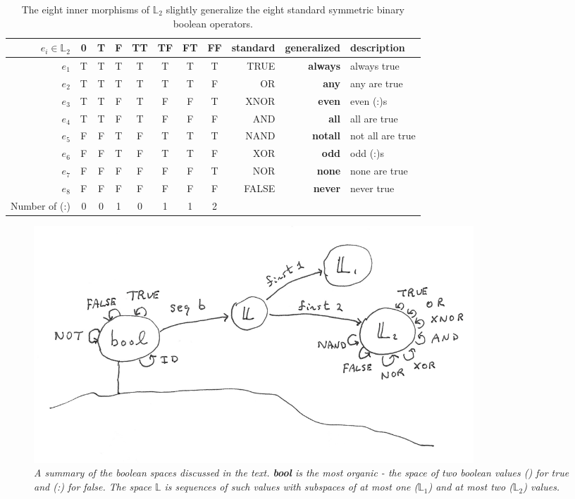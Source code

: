 \documentclass[11pt]{article}
\begin{document}
\begin{table}
\caption{The eight inner morphisms of ${\mathbb L}_2$ slightly generalize the eight standard symmetric binary boolean operators.}
\centering 
\begin{tabular}{r c c c c c c c r r l}
\hline\hline
$e_i \in {\mathbb L}_2$ & 0 & T & F & TT & TF & FT & FF & standard & generalized & description \\ [0.5ex] 
\hline
$e_1$  & T & T & T & T & T & T & T & TRUE & {\bf always} & always true \\
$e_2$  & T & T & T & T & T & T & F & OR & {\bf any} & any are true \\
$e_3$  & T & T & F & T & F & F & T & XNOR & {\bf even} & even (:)s \\
$e_4$ & T & T & F & T & F & F & F & AND & {\bf all} & all are true \\
$e_5$ & F & F & T & F & T & T & T & NAND & {\bf notall} & not all are true \\
$e_6$ & F & F & T & F & T & T & F & XOR & {\bf odd} & odd (:)s \\
$e_7$ & F & F & F & F & F & F & T & NOR & {\bf none} & none are true  \\
$e_8$ & F & F & F & F & F & F & F & FALSE & {\bf never} & never true \\
\hline
Number of (:)   & 0 & 0 & 1 & 0 & 1 & 1 & 2 &  \\ 
\hline
\end{tabular}
\label{table:L2}
\end{table} 

\begin{figure}[h]
\centering
\includegraphics[width=0.8\textwidth]{bool.png}
\caption{{\it A summary of the boolean spaces discussed in the text.  {\bf bool} is the most organic - the space of two boolean values () for true and (:) for false.  The space $\mathbb L$ is sequences of such values with subspaces of at most one (${\mathbb L}_1$) and at most two (${\mathbb L}_2$) values.}}
\end{figure}
\end{document}
